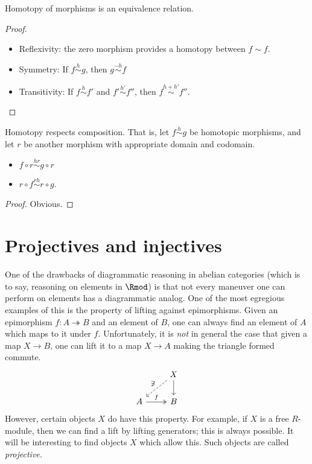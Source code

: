 \documentclass[main.tex]{subfiles}
\begin{document}
\begin{lemma}
  \label{lemma:homotopy_equivalence_relation}
  Homotopy of morphisms is an equivalence relation.
\end{lemma}
\begin{proof}
  \leavevmode
  \begin{itemize}
    \item Reflexivity: the zero morphism provides a homotopy between $f \sim f$.

    \item Symmetry: If $f \overset{h}{\sim} g$, then $g \overset{-h}{\sim} f$

    \item Transitivity: If $f \overset{h}{\sim} f'$ and $f' \overset{h'}{\sim} f''$, then $f \overset{h + h'}{\sim} f''$.
  \end{itemize}
\end{proof}

\begin{lemma}
  \label{lemma:homotopy_respects_composition}
  Homotopy respects composition. That is, let $f \overset{h}{\sim} g$ be homotopic morphisms, and let $r$ be another morphism with appropriate domain and codomain.
  \begin{itemize}
    \item $f \circ r \overset{hr}{\sim} g \circ r$

    \item $r \circ f \overset{rh}{\sim} r \circ g$.
  \end{itemize}
\end{lemma}
\begin{proof}
  Obvious.
\end{proof}

\section{Projectives and injectives}
\label{ssc:projectives_and_injectives}

One of the drawbacks of diagrammatic reasoning in abelian categories (which is to say, reasoning on elements in $\Rmod$) is that not every maneuver one can perform on elements has a diagrammatic analog. One of the most egregious examples of this is the property of lifting against epimorphisms. Given an epimorphism $f\colon A \twoheadrightarrow B$ and an element of $B$, one can always find an element of $A$ which maps to it under $f$. Unfortunately, it is \emph{not} in general the case that given a map $X \to B$, one can lift it to a map $X \to A$ making the triangle formed commute.
\begin{equation*}
  \begin{tikzcd}
    & X
    \arrow[d]
    \arrow[dl, swap, dashed, "\not\exists"]
    \\
    A
    \arrow[r, two heads, "f"]
    & B
  \end{tikzcd}
\end{equation*}
However, certain objects $X$ do have this property. For example, if $X$ is a free $R$-module, then we can find a lift by lifting generators; this is always possible. It will be interesting to find objects $X$ which allow this. Such objects are called \emph{projective.}
\end{document}
